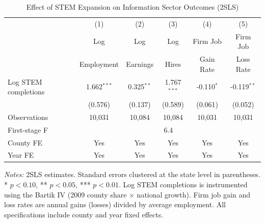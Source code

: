 \begin{table}[H]
\centering
\caption{Effect of STEM Expansion on Information Sector Outcomes (2SLS)}
\label{tab:main}
\begin{threeparttable}
\begin{tabular}{lccccc}
\toprule
 & (1) & (2) & (3) & (4) & (5) \\
 & Log & Log & Log & Firm Job & Firm Job \\
 & Employment & Earnings & Hires & Gain Rate & Loss Rate \\
\midrule
Log STEM completions & 1.662$^{***}$ & 0.325$^{**}$ & 1.767$^{***}$ & -0.110$^{*}$ & -0.119$^{**}$ \\
 & (0.576) & (0.137) & (0.589) & (0.061) & (0.052) \\
\addlinespace
Observations & 10,031 & 10,084 & 10,084 & 10,031 & 10,031 \\
First-stage F & \multicolumn{5}{c}{6.4} \\
County FE & Yes & Yes & Yes & Yes & Yes \\
Year FE & Yes & Yes & Yes & Yes & Yes \\
\bottomrule
\end{tabular}
\begin{tablenotes}[flushleft]
\small
\item \textit{Notes:} 2SLS estimates. Standard errors clustered at the state level in parentheses. * $p<0.10$, ** $p<0.05$, *** $p<0.01$. Log STEM completions is instrumented using the Bartik IV (2009 county share $\times$ national growth). Firm job gain and loss rates are annual gains (losses) divided by average employment. All specifications include county and year fixed effects.
\end{tablenotes}
\end{threeparttable}
\end{table}

